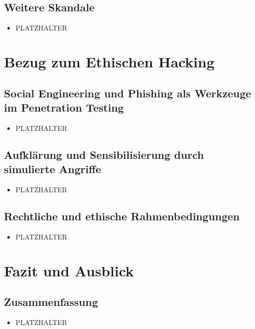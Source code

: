 \documentclass[12pt, a4paper, oneside]{scrartcl}
\begin{document}
\subsection{Weitere Skandale}
\begin{itemize}
  \item PLATZHALTER
\end{itemize}

\section{Bezug zum Ethischen Hacking}

\subsection{Social Engineering und Phishing als Werkzeuge im Penetration Testing}
\begin{itemize}
  \item PLATZHALTER
\end{itemize}

\subsection{Aufklärung und Sensibilisierung durch simulierte Angriffe}
\begin{itemize}
  \item PLATZHALTER
\end{itemize}

\subsection{Rechtliche und ethische Rahmenbedingungen}
\begin{itemize}
  \item PLATZHALTER
\end{itemize}

\section{Fazit und Ausblick}

\subsection{Zusammenfassung}
\begin{itemize}
  \item PLATZHALTER
\end{itemize}
\end{document}
